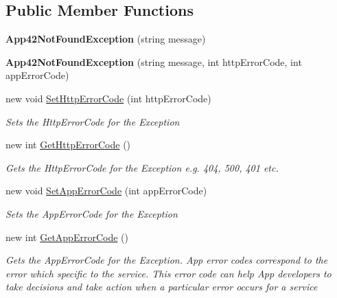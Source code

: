 \subsection*{Public Member Functions}
\begin{DoxyCompactItemize}
\item 
\hypertarget{classcom_1_1shephertz_1_1app42_1_1paas_1_1sdk_1_1csharp_1_1_app42_not_found_exception_a41be6b94d63400f5be1993192179fb7b}{{\bfseries App42\+Not\+Found\+Exception} (string message)}\label{classcom_1_1shephertz_1_1app42_1_1paas_1_1sdk_1_1csharp_1_1_app42_not_found_exception_a41be6b94d63400f5be1993192179fb7b}

\item 
\hypertarget{classcom_1_1shephertz_1_1app42_1_1paas_1_1sdk_1_1csharp_1_1_app42_not_found_exception_a0c3d3c2da543b68ce3bece697b8b249e}{{\bfseries App42\+Not\+Found\+Exception} (string message, int http\+Error\+Code, int app\+Error\+Code)}\label{classcom_1_1shephertz_1_1app42_1_1paas_1_1sdk_1_1csharp_1_1_app42_not_found_exception_a0c3d3c2da543b68ce3bece697b8b249e}

\item 
new void \hyperlink{classcom_1_1shephertz_1_1app42_1_1paas_1_1sdk_1_1csharp_1_1_app42_not_found_exception_a839537731125574b301cb668c5e1de02}{Set\+Http\+Error\+Code} (int http\+Error\+Code)
\begin{DoxyCompactList}\small\item\em Sets the Http\+Error\+Code for the Exception \end{DoxyCompactList}\item 
new int \hyperlink{classcom_1_1shephertz_1_1app42_1_1paas_1_1sdk_1_1csharp_1_1_app42_not_found_exception_a1380b79e822e5b761893fadda75d552d}{Get\+Http\+Error\+Code} ()
\begin{DoxyCompactList}\small\item\em Gets the Http\+Error\+Code for the Exception e.\+g. 404, 500, 401 etc. \end{DoxyCompactList}\item 
new void \hyperlink{classcom_1_1shephertz_1_1app42_1_1paas_1_1sdk_1_1csharp_1_1_app42_not_found_exception_a770058b973f2c536ec26b0b870ee361b}{Set\+App\+Error\+Code} (int app\+Error\+Code)
\begin{DoxyCompactList}\small\item\em Sets the App\+Error\+Code for the Exception \end{DoxyCompactList}\item 
new int \hyperlink{classcom_1_1shephertz_1_1app42_1_1paas_1_1sdk_1_1csharp_1_1_app42_not_found_exception_a84fd0dbaa129e74846227562d415467e}{Get\+App\+Error\+Code} ()
\begin{DoxyCompactList}\small\item\em Gets the App\+Error\+Code for the Exception. App error codes correspond to the error which specific to the service. This error code can help App developers to take decisions and take action when a particular error occurs for a service \end{DoxyCompactList}\end{DoxyCompactItemize}


